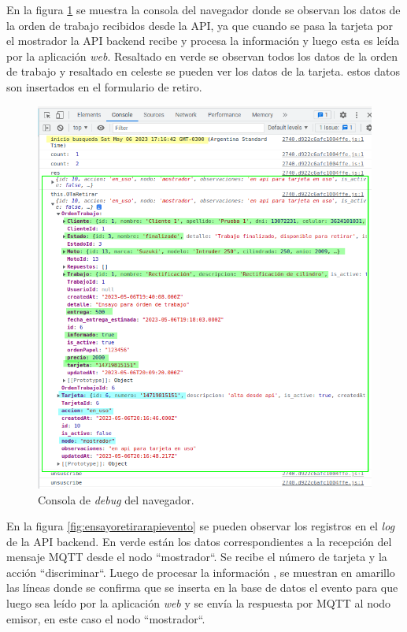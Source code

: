 En la figura \ref{fig:ensayoretirar-web-2} se muestra la consola del navegador donde se observan los datos de la orden de trabajo recibidos desde la API, ya que cuando se pasa la tarjeta por el mostrador la API backend recibe y procesa la información y luego esta es leída por la aplicación \textit{web}. Resaltado en verde se observan todos los datos de la orden de trabajo y resaltado en celeste se pueden ver los datos de la tarjeta. estos datos son insertados en el formulario de retiro.

\begin{figure}[H]
	\centering
	\includegraphics[width=\textwidth]{./Figures/ensayo-1/21.retirar-web-2.png}
	\caption{Consola de \textit{debug} del navegador.}
	\label{fig:ensayoretirar-web-2}
\end{figure}

En la figura \ref{fig:ensayoretirarapievento} se pueden observar los registros en el \textit{log} de la API backend. En verde están los datos correspondientes a la recepción del mensaje MQTT desde el nodo ``mostrador``. Se recibe el número de tarjeta y la acción ``discriminar``. Luego de procesar la información , se muestran en amarillo las líneas donde se confirma que se inserta en la base de datos el evento para que luego sea leído por la aplicación \textit{web} y se envía la respuesta por MQTT al nodo emisor, en este caso el nodo ``mostrador``.  

